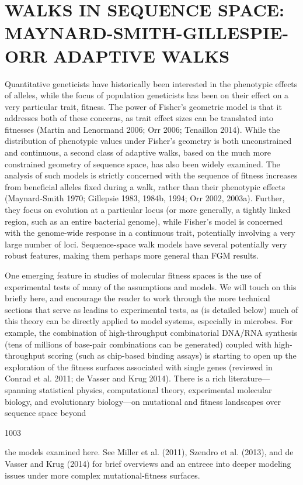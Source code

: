 \documentclass{article}
\begin{document}
\section{WALKS IN SEQUENCE SPACE: MAYNARD-SMITH-GILLESPIE-ORR ADAPTIVE WALKS}
Quantitative geneticists have historically been interested in the phenotypic effects of alleles, while the focus of population geneticists has been on their effect on a very particular trait, fitness. The power of Fisher's geometric model is that it addresses both of these concerns, as trait effect sizes can be translated into fitnesses (Martin and Lenormand 2006; Orr 2006; Tenaillon 2014). While the distribution of phenotypic values under Fisher's geometry is both unconstrained and continuous, a second class of adaptive walks, based on the much more constrained geometry of sequence space, has also been widely examined. The analysis of such models is strictly concerned with the sequence of fitness increases from beneficial alleles fixed during a walk, rather than their phenotypic effects (Maynard-Smith 1970; Gillepsie 1983, 1984b, 1994; Orr 2002, 2003a). Further, they focus on evolution at a particular locus (or more generally, a tightly linked region, such as an entire bacterial genome), while Fisher's model is concerned with the genome-wide response in a continuous trait, potentially involving a very large number of loci. Sequence-space walk models have several potentially very robust features, making them perhaps more general than FGM results.

One emerging feature in studies of molecular fitness spaces is the use of experimental tests of many of the assumptions and models. We will touch on this briefly here, and encourage the reader to work through the more technical sections that serve as leadins to experimental tests, as (is detailed below) much of this theory can be directly applied to model systems, especially in microbes. For example, the combination of high-throughput combinatorial DNA/RNA synthesis (tens of millions of base-pair combinations can be generated) coupled with high-throughput scoring (such as chip-based binding assays) is starting to open up the exploration of the fitness surfaces associated with single genes (reviewed in Conrad et al. 2011; de Vasser and Krug 2014). There is a rich literature—spanning statistical physics, computational theory, experimental molecular biology, and evolutionary biology—on mutational and fitness landscapes over sequence space beyond

1003

the models examined here. See Miller et al. (2011), Szendro et al. (2013), and de Vasser and Krug (2014) for brief overviews and an entreee into deeper modeling issues under more complex mutational-fitness surfaces.
\end{document}
